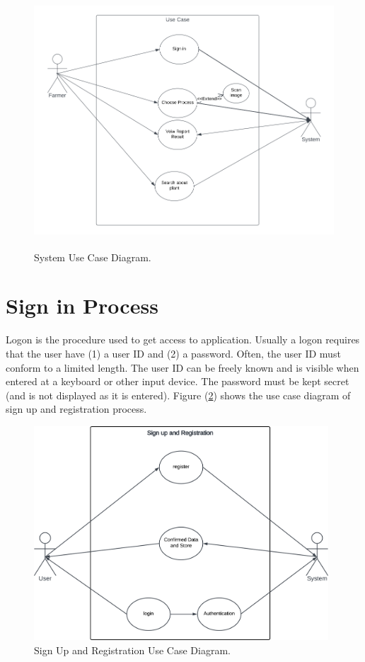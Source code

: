 \begin{figure}[H]
    \centering
    \includegraphics[height=9.5cm]{photos/chapter04/2.png}
    \caption{System Use Case Diagram.}
    \label{fig:systemusecase}
\end{figure}

\section{Sign in Process}

Logon is the procedure used to get access to application. 
Usually a logon requires that the user have (1) a user ID 
and (2) a password. Often, the user ID must conform to a 
limited length. The user ID can be freely known and is visible
when entered at a keyboard or other input device. The password 
must be kept secret (and is not displayed as it is entered). 
Figure (\ref{fig:signupusecase}) shows the use case diagram of sign up and registration process.
\begin{figure}[H]
    \centering
    \includegraphics[height=8cm]{photos/chapter04/3.png}
    \caption{Sign Up and Registration Use Case Diagram.}
    \label{fig:signupusecase}
\end{figure}

